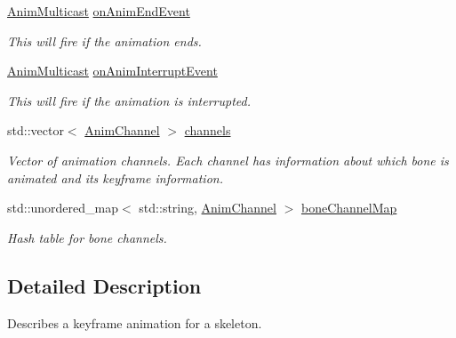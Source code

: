 \begin{DoxyCompactItemize}
\mbox{\label{structAnimation_a8f971c5370b646d026147098db0bd66b}} 
\hyperlink{structAnimation_ac07104f8333840b8c2fca7fe620ace19}{Anim\+Multicast} \hyperlink{structAnimation_a8f971c5370b646d026147098db0bd66b}{on\+Anim\+End\+Event}
\begin{DoxyCompactList}\small\item\em This will fire if the animation ends. \end{DoxyCompactList}\item 
\mbox{\label{structAnimation_a589b561e4143d544f9d3eb678650efd1}} 
\hyperlink{structAnimation_ac07104f8333840b8c2fca7fe620ace19}{Anim\+Multicast} \hyperlink{structAnimation_a589b561e4143d544f9d3eb678650efd1}{on\+Anim\+Interrupt\+Event}
\begin{DoxyCompactList}\small\item\em This will fire if the animation is interrupted. \end{DoxyCompactList}\item 
\mbox{\label{structAnimation_a929158d26b6d71f1d297820625e46fc7}} 
std\+::vector$<$ \hyperlink{structAnimChannel}{Anim\+Channel} $>$ \hyperlink{structAnimation_a929158d26b6d71f1d297820625e46fc7}{channels}
\begin{DoxyCompactList}\small\item\em Vector of animation channels. Each channel has information about which bone is animated and its keyframe information. \end{DoxyCompactList}\item 
\mbox{\label{structAnimation_ab0ec7a6ccca71fc844b62e2309a7a539}} 
std\+::unordered\+\_\+map$<$ std\+::string, \hyperlink{structAnimChannel}{Anim\+Channel} $>$ \hyperlink{structAnimation_ab0ec7a6ccca71fc844b62e2309a7a539}{bone\+Channel\+Map}
\begin{DoxyCompactList}\small\item\em Hash table for bone channels. \end{DoxyCompactList}\end{DoxyCompactItemize}


\subsection{Detailed Description}
Describes a keyframe animation for a skeleton. 

